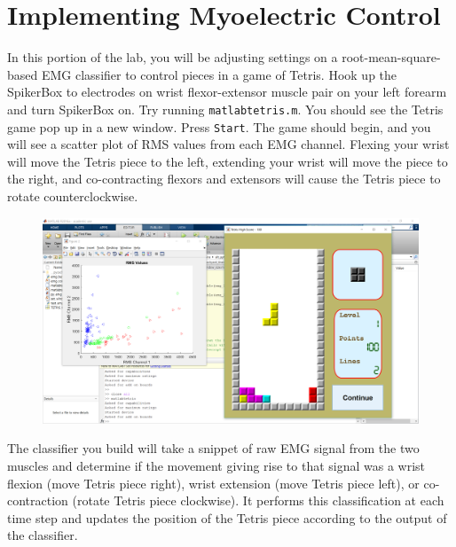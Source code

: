 \documentclass[10pt,oneside,a4paper]{article}
\begin{document}
\section{Implementing Myoelectric Control}
In this portion of the lab, you will be adjusting settings on a root-mean-square-based EMG classifier to control pieces in a game of Tetris. Hook up the SpikerBox to electrodes on wrist flexor-extensor muscle pair on your left forearm and turn SpikerBox on. Try running \texttt{matlabtetris.m}. You should see the Tetris game pop up in a new window. Press \texttt{Start}. The game should begin, and you will see a scatter plot of RMS values from each EMG channel. Flexing your wrist will move the Tetris piece to the left, extending your wrist will move the piece to the right, and co-contracting flexors and extensors will cause the Tetris piece to rotate counterclockwise. 
\begin{figure}[H]
\includegraphics[width=\textwidth]{tetris_game.PNG}
\end{figure}
The classifier you build will take a snippet of raw EMG signal from the two muscles and determine if the movement giving rise to that signal was a wrist flexion (move Tetris piece right), wrist extension (move Tetris piece left), or co-contraction (rotate Tetris piece clockwise). It performs this classification at each time step and updates the position of the Tetris piece according to the output of the classifier.
\end{document}
